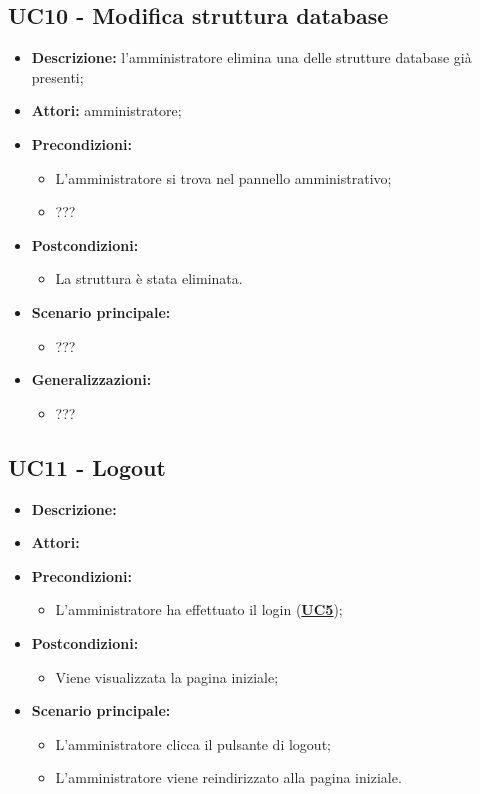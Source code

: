 \documentclass[5pt]{article}
\begin{document}
\subsection{UC10 - Modifica struttura database}
\label{sec:UC10}
\begin{itemize}
    \item \textbf{Descrizione:}  l’amministratore elimina una delle strutture database già presenti;
    \item \textbf{Attori:} amministratore;
    \item \textbf{Precondizioni:} 
    \begin{itemize}
        \item L’amministratore si trova nel pannello amministrativo;
        \item ???
    \end{itemize}
    \item \textbf{Postcondizioni:} 
    \begin{itemize}
        \item La struttura è stata eliminata.
    \end{itemize}
    \item \textbf{Scenario principale:} 
    \begin{itemize}
        \item ???
    \end{itemize}
    \item \textbf{Generalizzazioni:} 
    \begin{itemize}
        \item ???
    \end{itemize}
\end{itemize}

\subsection{UC11 - Logout}
\label{sec:UC11}
\begin{itemize}
    \item \textbf{Descrizione:} 
    \item \textbf{Attori:} 
    \item \textbf{Precondizioni:} 
    \begin{itemize}
        \item L’amministratore ha effettuato il login (\hyperref[sec:UC5]{\textbf{UC5}});
    \end{itemize}
    \item \textbf{Postcondizioni:} 
    \begin{itemize}
        \item Viene visualizzata la pagina iniziale;
    \end{itemize}
    \item \textbf{Scenario principale:} 
    \begin{itemize}
        \item L’amministratore clicca il pulsante di logout;
        \item L’amministratore viene reindirizzato alla pagina iniziale.
    \end{itemize}
\end{itemize}
\end{document}
